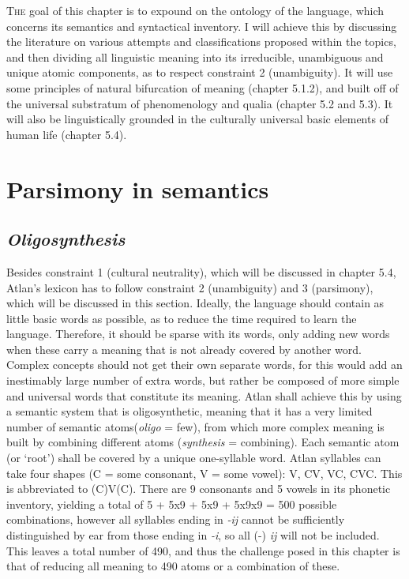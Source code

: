 
\lettrine{T}{he} goal of this chapter is to expound on the ontology of the language, which concerns its semantics and syntactical inventory. I will achieve this by discussing the literature on various attempts and classifications proposed within the topics, and then dividing all linguistic meaning into its irreducible, unambiguous and unique atomic components, as to respect constraint 2 (unambiguity). It will use some principles of natural bifurcation of meaning (chapter 5.1.2), and built off of the universal substratum of phenomenology and qualia (chapter 5.2 and 5.3). It will also be linguistically grounded in the culturally universal basic elements of human life (chapter 5.4).


\section{Parsimony in semantics}

\subsection{\it Oligosynthesis}


Besides constraint 1 (cultural neutrality), which will be discussed in chapter 5.4, Atlan’s lexicon has to follow constraint 2 (unambiguity) and 3 (parsimony), which will be discussed in this section. Ideally, the language should contain as little basic words as possible, as to reduce the time required to learn the language. Therefore, it should be sparse with its words, only adding new words when these carry a meaning that is not already covered by another word. Complex concepts should not get their own separate words, for this would add an inestimably large number of extra words, but rather be composed of more simple and universal words that constitute its meaning. Atlan shall achieve this by using a semantic system that is oligosynthetic, meaning that it has a very limited number of semantic atoms\footnotemark (\textit{oligo}  = few), from which more complex meaning is built by combining different atoms (\textit{synthesis}  = combining). Each semantic atom (or ‘root’) shall be covered by a unique one-syllable word. Atlan syllables can take four shapes (C = some consonant, V = some vowel): V, CV, VC, CVC. This is abbreviated to (C)V(C). There are 9 consonants and 5 vowels in its phonetic inventory, yielding a total of 5 + 5x9 + 5x9 + 5x9x9 = 500 possible combinations, however all syllables ending in \textit{-ij} cannot be sufficiently distinguished by ear from those ending in \textit{-i}, so all (-) \textit{ij} will not be included. This leaves a total number of 490, and thus the challenge posed in this chapter is that of reducing all meaning to 490 atoms or a combination of these.  


